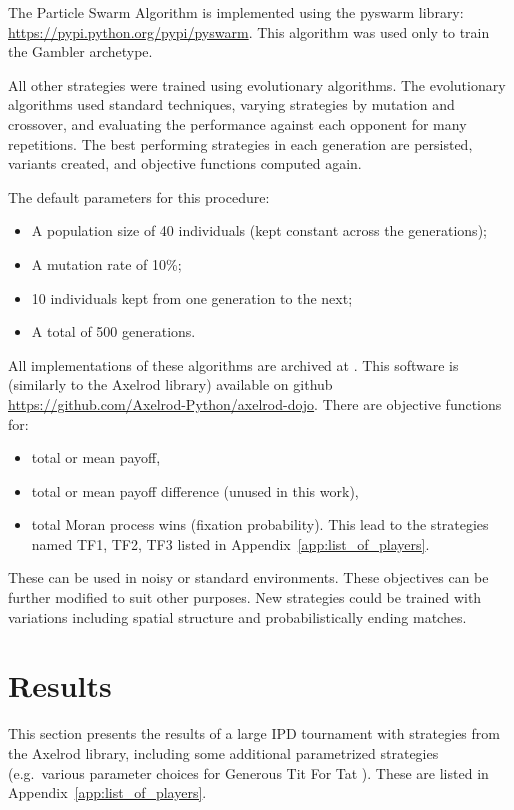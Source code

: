 \documentclass[10pt,letterpaper]{article}
\begin{document}
The Particle Swarm Algorithm is implemented using the pyswarm library:
\url{https://pypi.python.org/pypi/pyswarm}. This algorithm was used only to
train the Gambler archetype.

All other strategies were trained using evolutionary algorithms. The
evolutionary algorithms used standard techniques, varying strategies by
mutation and crossover, and evaluating the performance against each opponent
for many repetitions. The best performing strategies in each generation are
persisted, variants created, and objective functions computed again.

The default parameters for this procedure:

\begin{itemize}
	\item A population size of 40 individuals (kept constant across the
        generations);
	\item A mutation rate of 10\%;
	\item 10 individuals kept from one generation to the next;
    \item A total of 500 generations.
\end{itemize}

All implementations of these algorithms are archived at
\cite{dojo}. This software is (similarly to the Axelrod
library) available on github
\url{https://github.com/Axelrod-Python/axelrod-dojo}. There are objective
functions for:

\begin{itemize}
 \item total or mean payoff,
 \item total or mean payoff difference (unused in this work),
 \item total Moran process wins (fixation probability). This lead to the
     strategies named TF1, TF2, TF3 listed in
     Appendix~\ref{app:list_of_players}.
\end{itemize}

These can be used in noisy or standard environments. These objectives can be
further modified to suit other purposes. New strategies could be trained with
variations including spatial structure and probabilistically ending matches.

\section*{Results}

This section presents the results of a large IPD tournament with
strategies from the Axelrod library, including some additional parametrized
strategies (e.g.\ various parameter choices for Generous Tit For Tat
\cite{Gaudesi2016}). These are
listed in Appendix~\ref{app:list_of_players}.
\end{document}
